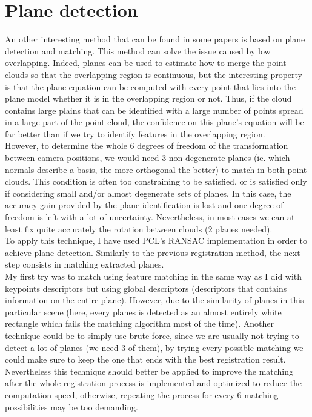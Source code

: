 \section{Plane detection}

An other interesting method that can be found in some papers is based on plane detection and matching. This method can solve the issue caused by low overlapping. Indeed, planes can be used to estimate how to merge the point clouds so that the overlapping region is continuous, but the interesting property is that the plane equation can be computed with every point that lies into the plane model whether it is in the overlapping region or not. Thus, if the cloud contains large plains that can be identified with a large number of points spread in a large part of the point cloud, the confidence on this plane's equation will be far better than if we try to identify features in the overlapping region. \\
However, to determine the whole 6 degrees of freedom of the transformation between camera positions, we would need 3 non-degenerate planes (ie. which normals describe a basis, the more orthogonal the better) to match in both point clouds. This condition is often too constraining to be satisfied, or is satisfied only if considering small and/or almost degenerate sets of planes. In this case, the accuracy gain provided by the plane identification is lost and one degree of freedom is left with a lot of uncertainty. Nevertheless, in most cases we can at least fix quite accurately the rotation between clouds (2 planes needed). \\
To apply this technique, I have used PCL's RANSAC implementation in order to achieve plane detection. Similarly to the previous registration method, the next step consists in matching extracted planes. \\
My first try was to match using feature matching in the same way as I did with keypoints descriptors but using global descriptors (descriptors that contains information on the entire plane). However, due to the similarity of planes in this particular scene (here, every planes is detected as an almost entirely white rectangle which fails the matching algorithm most of the time). Another technique could be to simply use brute force, since we are usually not trying to detect a lot of planes (we need 3 of them), by trying every possible matching we could make sure to keep the one that ends with the best registration result. Nevertheless this technique should better be applied to improve the matching after the whole registration process is implemented and optimized to reduce the computation speed, otherwise, repeating the process for every 6 matching possibilities may be too demanding. \\
